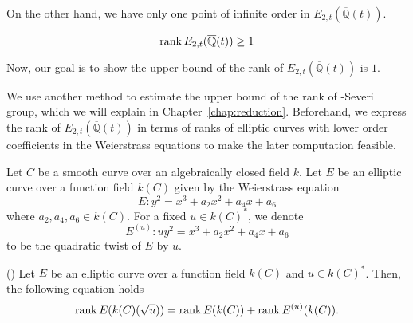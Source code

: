 \documentclass[main]{subfiles}
\begin{document}
On the other hand, we have only one point of infinite order in $E_{2,t}(\overline{\mathbb{Q}}(t))$.
\begin{lem}
    \begin{equation}
        \operatorname{rank} E_{2,t}(\overline{\mathbb{Q}}(t)) \geq 1
    \end{equation}
\end{lem}
Now, our goal is to show the upper bound of the rank of $E_{2,t}(\overline{\mathbb{Q}}(t))$ is $1$.

We use another method to estimate the upper bound of the rank of \Neron-Severi group, which we will explain in Chapter~\ref{chap:reduction}.
Beforehand, we express the rank of $E_{2,t}(\overline{\mathbb{Q}}(t))$ in terms of ranks of elliptic curves with lower order coefficients in the Weierstrass equations to make the later computation feasible.

\begin{dfn}
    Let $C$ be a smooth curve over an algebraically closed field $k$.
    Let $E$ be an elliptic curve over a function field $k(C)$ given by the Weierstrass equation
    \begin{equation}
        E: y^{2} = x^{3} + a_{2} x^{2} + a_{4} x + a_{6}
    \end{equation}
    where $a_{2}, a_{4}, a_{6} \in k(C)$.
    For a fixed $u \in k(C)^*$, we denote
    \begin{equation}
        E^{(u)}: u y^{2} = x^{3} + a_{2} x^{2} + a_{4} x + a_{6}
    \end{equation}
    to be the quadratic twist of $E$ by $u$.
\end{dfn}

\begin{thm}{(\cite[Exercise 10.16]{ref:aec})}
    \label{thm:twist}
    Let $E$ be an elliptic curve over a function field $k(C)$ and $u \in k(C)^*$.
    Then, the following equation holds
    \begin{equation}
        \operatorname{rank} E(k(C)(\sqrt{u})) = \operatorname{rank} E(k(C)) + \operatorname{rank} E^{(u)}(k(C)).
    \end{equation}
\end{thm}
\end{document}
